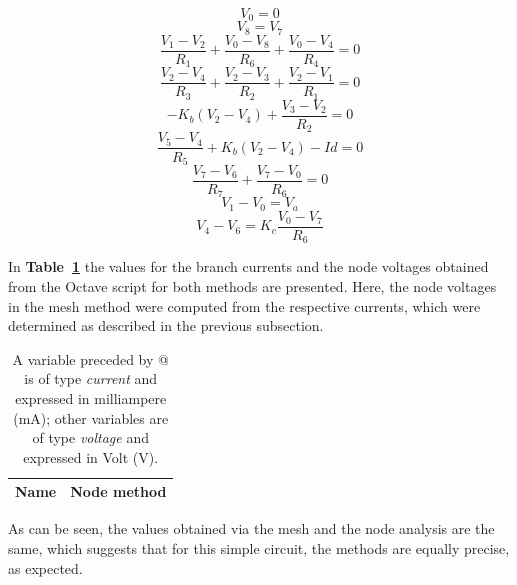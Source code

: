 \begin {equation}
	V_0 = 0
	\label{eq:n1}
\end{equation}
\begin {equation}
	V_8 = V_7
	\label{eq:n2}
\end{equation}
\begin {equation}
	\frac{V_1-V_2}{R_1} + \frac{V_0 - V_8}{R_6} + \frac{V_0 - V_4}{R_4} = 0
	\label{eq:n3}
\end{equation}
\begin {equation}
	\frac{V_2-V_4}{R_3} + \frac{V_2-V_3}{R_2} + \frac{V_2-V_1}{R_1} = 0
	\label{eq:n4}
\end{equation}
\begin {equation}
	- K_b(V_2-V_4) + \frac{V_3-V_2}{R_2} = 0
	\label{eq:n5}
\end{equation}
\begin {equation}
	\frac{V_5-V_4}{R_5} + K_b(V_2-V_4) - Id = 0
	\label{eq:n6}
\end{equation}
\begin {equation}
	\frac{V_7-V_6}{R_7} + \frac{V_7 - V_0}{R_6} = 0
	\label{eq:n7}
\end{equation}
\begin {equation}
	V_1 - V_0 = V_a
	\label{eq:n8}
\end{equation}
\begin {equation}
	V_4 - V_6 = K_c  \frac{V_0 - V_7}{R_6}
	\label{eq:n9}
\end{equation}


In \textbf{Table~\ref{tab:theoretical}} the values for the branch currents and the node voltages obtained from the Octave script for both methods are presented. Here, the node voltages in the mesh method were computed from the respective currents, which were determined as described in the previous subsection.
 \pagebreak 
\begin{table}[h]
  \centering
  \begin{tabular}{|l|r|}
    \hline    
    {\bf Name} & {\bf Node method}\\ \hline
    
  \end{tabular}
  \caption{A variable preceded by @ is of type {\em current}
    and expressed in milliampere (mA); other variables are of type {\it voltage} and expressed in
    Volt (V).}
  \label{tab:theoretical}
\end{table}


As can be seen, the values obtained via the mesh and the node analysis are the same, which suggests that for this simple circuit, the methods are equally precise, as expected.


